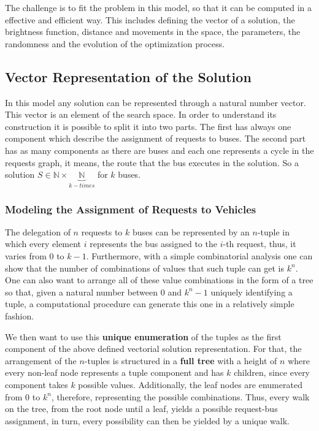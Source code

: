 \documentclass[tuberlin,cic,tc,openright,english,noabntcite,oneside]{iiufrgs}
\begin{document}
The challenge is to fit the problem in this model, so that it can be computed in a effective and efficient way. This includes defining the vector of a solution, the brightness function, distance and movements in the space, the parameters, the randomness and the evolution of the optimization process.

\subsection{Vector Representation of the Solution}
In this model any solution can be represented through a natural number vector. This vector is an element of the search space. In order to understand its construction it is possible to split it into two parts. The first has always one component which describe the assignment of requests to buses. The second part has as many components as there are buses and each one represents a cycle in the requests graph, it means, the route that the bus executes in the solution. So a solution $S \in \mathbb{N} \times \underbrace{\mathbb{N}}_{k-times}$ for $k$ buses.

\subsubsection{Modeling the Assignment of Requests to Vehicles}\label{sec:model-request-bus}
The delegation of $n$ requests to $k$ buses can be represented by an $n$-tuple in which every element $i$ represents the bus assigned to the $i$-th request, thus, it varies from $0$ to $k-1$. Furthermore, with a simple combinatorial analysis one can show that the number of combinations of values that such tuple can get is $k^n$. One can also want to arrange all of these value combinations in the form of a tree so that, given a natural number between $0$ and $k^n-1$ uniquely identifying a tuple, a computational procedure can generate this one in a relatively simple fashion.

We then want to use this \textbf{unique enumeration} of the tuples as the first component of the above defined vectorial solution representation. For that, the arrangement of the $n$-tuples is structured in a \textbf{full tree} with a height of $n$ where every non-leaf node represents a tuple component and has $k$ children, since every component takes $k$ possible values. Additionally, the leaf nodes are enumerated from $0$ to $k^{n}$, therefore, representing the possible combinations. Thus, every walk on the tree, from the root node until a leaf, yields a possible request-bus assignment, in turn, every possibility can then be yielded by a unique walk.
\end{document}
